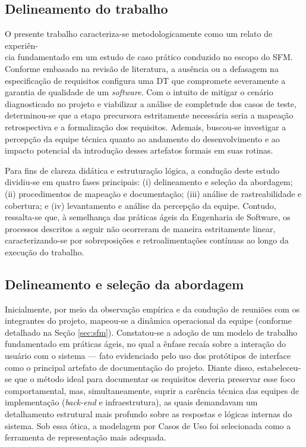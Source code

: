 \subsection{Delineamento do trabalho}

O presente trabalho caracteriza-se metodologicamente como um relato de experiên-\\cia fundamentado em um estudo de caso prático conduzido no escopo do SFM. Conforme embasado na revisão de literatura, a ausência ou a defasagem na especificação de requisitos configura uma DT que compromete severamente a garantia de qualidade de um \textit{software}. Com o intuito de mitigar o cenário diagnosticado no projeto e viabilizar a análise de completude dos casos de teste, determinou-se que a etapa precursora estritamente necessária seria a mapeação retrospectiva e a formalização dos requisitos. Ademais, buscou-se investigar a percepção da equipe técnica quanto ao andamento do desenvolvimento e ao impacto potencial da introdução desses artefatos formais em suas rotinas.


Para fins de clareza didática e estruturação lógica, a condução deste estudo dividiu-se em quatro fases principais: (i) delineamento e seleção da abordagem; (ii) procedimentos de mapeação e documentação; (iii) análise de rastreabilidade e cobertura; e (iv) levantamento e análise da percepção da equipe. Contudo, ressalta-se que, à semelhança das práticas ágeis da Engenharia de Software, os processos descritos a seguir não ocorreram de maneira estritamente linear, caracterizando-se por sobreposições e retroalimentações contínuas ao longo da execução do trabalho.

\subsection{Delineamento e seleção da abordagem}

Inicialmente, por meio da observação empírica e da condução de reuniões com os integrantes do projeto, mapeou-se a dinâmica operacional da equipe (conforme detalhado na Seção \ref{sec:sfm}). Constatou-se a adoção de um modelo de trabalho fundamentado em práticas ágeis, no qual a ênfase recaía sobre a interação do usuário com o sistema --- fato evidenciado pelo uso dos protótipos de interface como o principal artefato de documentação do projeto. Diante disso, estabeleceu-se que o método ideal para documentar os requisitos deveria preservar esse foco comportamental, mas, simultaneamente, suprir a carência técnica das equipes de implementação (\textit{back-end} e infraestrutura), as quais demandavam um detalhamento estrutural mais profundo sobre as respostas e lógicas internas do sistema. Sob essa ótica, a modelagem por Casos de Uso foi selecionada como a ferramenta de representação mais adequada.

